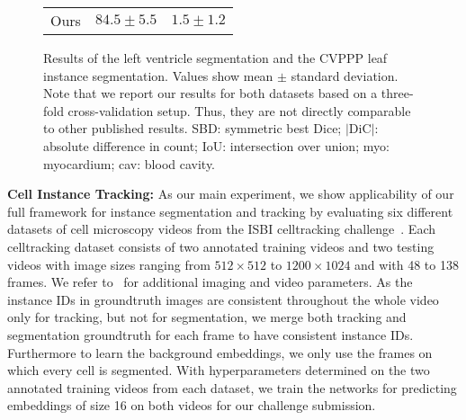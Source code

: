 \documentclass[runningheads,a4paper]{llncs}
\begin{document}
\begin{figure}[t]
\begin{minipage}{0.5\textwidth}
{\begin{tabular}{c|c|c}
\hline
Ours & $84.5 \pm 5.5$ & $1.5 \pm 1.2$\\
\end{tabular}}
\end{minipage}
\addtocounter{figure}{2}
\captionsetup{labelformat=andfigure}
\addtocounter{figure}{-1}
\caption{Results of the left ventricle segmentation and the CVPPP leaf instance segmentation.
Values show mean $\pm$ standard deviation.
Note that we report our results for both datasets based on a three-fold cross-validation setup.
Thus, they are not directly comparable to other published results.
SBD: symmetric best Dice; $|$DiC$|$: absolute difference in count; IoU: intersection over union; myo: myocardium; cav: blood cavity.}
\label{fig:plant_heart}
\end{figure}

\noindent\textbf{Cell Instance Tracking:}
As our main experiment, we show applicability of our full framework for instance segmentation and tracking by evaluating six different datasets of cell microscopy videos from the ISBI celltracking challenge~\cite{Ulman2017}.
Each celltracking dataset consists of two annotated training videos and two testing videos with image sizes ranging from $512\times512$ to $1200\times1024$ and with 48 to 138 frames.
We refer to~\cite{Maska2014} for additional imaging and video parameters.
As the instance IDs in groundtruth images are consistent throughout the whole video only for tracking, but not for segmentation, we merge both tracking and segmentation groundtruth for each frame to have consistent instance IDs.
Furthermore to learn the background embeddings, we only use the frames on which every cell is segmented.
With hyperparameters determined on the two annotated training videos from each dataset, we train the networks for predicting embeddings of size 16 on both videos for our challenge submission.
\end{document}

